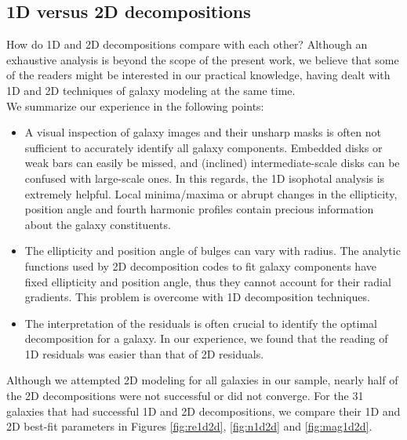 \documentclass[preprint2]{emulateapj}
\begin{document}


\subsection{1D versus 2D decompositions}
How do 1D and 2D decompositions compare with each other? 
Although an exhaustive analysis is beyond the scope of the present work, 
we believe that some of the readers might be interested in our practical knowledge, 
having dealt with 1D and 2D techniques of galaxy modeling at the same time. \\
We summarize our experience in the following points:
\begin{itemize}
\item A visual inspection of galaxy images and their unsharp masks is often not sufficient to accurately identify all galaxy components. 
Embedded disks or weak bars can easily be missed, and (inclined) intermediate-scale disks can be confused with large-scale ones.
In this regards, the 1D isophotal analysis is extremely helpful. 
Local minima/maxima or abrupt changes in the ellipticity, position angle and fourth harmonic profiles contain precious information 
about the galaxy constituents.
\item The ellipticity and position angle of bulges can vary with radius.
The analytic functions used by 2D decomposition codes to fit galaxy components have fixed ellipticity and position angle, 
thus they cannot account for their radial gradients. 
This problem is overcome with 1D decomposition techniques.
\item The interpretation of the residuals is often crucial to identify the optimal decomposition for a galaxy. 
In our experience, we found that the reading of 1D residuals was easier than that of 2D residuals.
\end{itemize}
Although we attempted 2D modeling for all galaxies in our sample, 
nearly half of the 2D decompositions were not successful or did not converge.
For the 31 galaxies that had successful 1D and 2D decompositions, 
we compare their 1D and 2D best-fit parameters in Figures \ref{fig:re1d2d}, \ref{fig:n1d2d} and \ref{fig:mag1d2d}.
\end{document}
